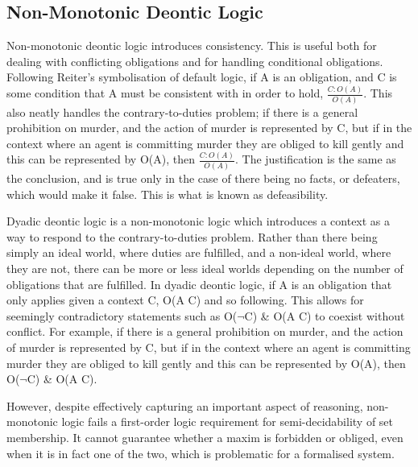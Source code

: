 \documentclass{l4proj}
\begin{document}
\subsection{Non-Monotonic Deontic Logic}
Non-monotonic deontic logic introduces consistency\cite{Powers}. This is useful both for dealing with conflicting obligations and for handling conditional obligations\cite{Horty}. Following Reiter's symbolisation of default logic\cite{Reiter}, if A is an obligation, and C is some condition that A must be consistent with in order to hold, \( \frac{C : O(A)}{O(A)} \). This also neatly handles the contrary-to-duties problem; if there is a general prohibition on murder, and the action of murder is represented by C, but if in the context where an agent is committing murder they are obliged to kill gently and this can be represented by O(A), then \( \frac{C : O(A)}{O(A)} \). The justification is the same as the conclusion, and is true only in the case of there being no facts, or defeaters, which would make it false. This is what is known as defeasibility. 

Dyadic deontic logic is a non-monotonic logic which introduces a context as a way to respond to the contrary-to-duties problem. Rather than there being simply an ideal world, where duties are fulfilled, and a non-ideal world, where they are not, there can be more or less ideal worlds depending on the number of obligations that are fulfilled. In dyadic deontic logic, if A is an obligation that only applies given a context C, O(A \textbar C) and so following. This allows for seemingly contradictory statements such as O(\( \neg \)C) \& O(A \textbar C) to coexist without conflict. For example, if there is a general prohibition on murder, and the action of murder is represented by C, but if in the context where an agent is committing murder they are obliged to kill gently and this can be represented by O(A), then O(\( \neg \)C) \& O(A \textbar C). 

However, despite effectively capturing an important aspect of reasoning, non-monotonic logic fails a first-order logic requirement for semi-decidability of set membership. It cannot guarantee whether a maxim is forbidden or obliged, even when it is in fact one of the two, which is problematic for a formalised system. 
\end{document}
